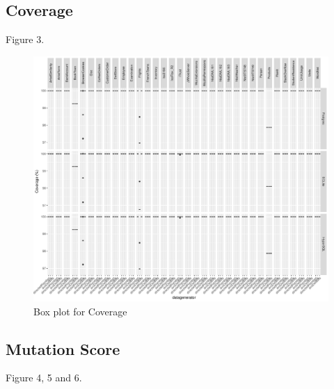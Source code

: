 \documentclass[runningheads,a4paper]{llncs}
\begin{document}
\subsection{Coverage}\label{coverage-1}

Figure 3.

\begin{figure}[htbp]
\centering
\includegraphics{../plots/figure22.pdf}
\caption{Box plot for Coverage}
\end{figure}

\subsection{Mutation Score}\label{mutation-score}

Figure 4, 5 and 6.
\end{document}
